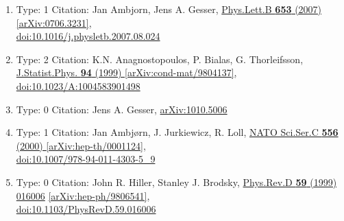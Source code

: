 \documentclass[a4paper,10pt]{article}
\begin{document}
\begin{enumerate}
\begin{enumerate}
  \item Type: 1 Citation: Jan Ambjorn, Jens A. Gesser, \href{https://www.doi.org/10.1016/j.physletb.2007.08.024}{Phys.Lett.B {\bf 653} (2007) }  \href{https://arxiv.org/abs/0706.3231}{[arXiv:0706.3231]},\\\href{https://www.doi.org/10.1016/j.physletb.2007.08.024}{doi:10.1016/j.physletb.2007.08.024}
  \item Type: 2 Citation: K.N. Anagnostopoulos, P. Bialas, G. Thorleifsson, \href{https://www.doi.org/10.1023/A:1004583901498}{J.Statist.Phys. {\bf 94} (1999) }  \href{https://arxiv.org/abs/cond-mat/9804137}{[arXiv:cond-mat/9804137]},\\\href{https://www.doi.org/10.1023/A:1004583901498}{doi:10.1023/A:1004583901498}
  \item Type: 0 Citation: Jens A. Gesser, \href{https://arxiv.org/abs/1010.5006}{arXiv:1010.5006}
  \item Type: 1 Citation: Jan Ambjørn, J. Jurkiewicz, R. Loll, \href{https://www.doi.org/10.1007/978-94-011-4303-5_9}{NATO Sci.Ser.C {\bf 556} (2000) }  \href{https://arxiv.org/abs/hep-th/0001124}{[arXiv:hep-th/0001124]},\\\href{https://www.doi.org/10.1007/978-94-011-4303-5_9}{doi:10.1007/978-94-011-4303-5\_9}
  \item Type: 0 Citation: John R. Hiller, Stanley J. Brodsky, \href{https://www.doi.org/10.1103/PhysRevD.59.016006}{Phys.Rev.D {\bf 59} (1999) 016006}  \href{https://arxiv.org/abs/hep-ph/9806541}{[arXiv:hep-ph/9806541]},\\\href{https://www.doi.org/10.1103/PhysRevD.59.016006}{doi:10.1103/PhysRevD.59.016006}
\end{enumerate}

\end{enumerate}
\end{document}
